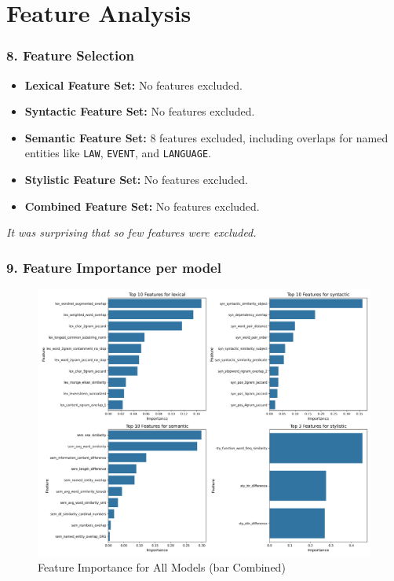 \documentclass{beamer}
\begin{document}
\section{Feature Analysis}


\begin{frame}
  \frametitle{8. Feature Selection}
  \begin{itemize}
    \item \textbf{Lexical Feature Set:} No features excluded.
    \item \textbf{Syntactic Feature Set:} No features excluded.
    \item \textbf{Semantic Feature Set:} 8 features excluded, including overlaps for named entities like \texttt{LAW}, \texttt{EVENT}, and \texttt{LANGUAGE}.
    \item \textbf{Stylistic Feature Set:} No features excluded.
    \item \textbf{Combined Feature Set:} No features excluded.
  \end{itemize}
  \vspace{0.5cm}
  \centering
  \textit{It was surprising that so few features were excluded.}
\end{frame}

\begin{frame}
  \frametitle{9. Feature Importance per model}
  \begin{figure}
    \centering
    \includegraphics[width=0.7\linewidth]{img/Top_Features_Per_Feature_Set_Model.png}
    \caption{Feature Importance for All Models (bar Combined)}
  \end{figure}
\end{frame}
\end{document}
